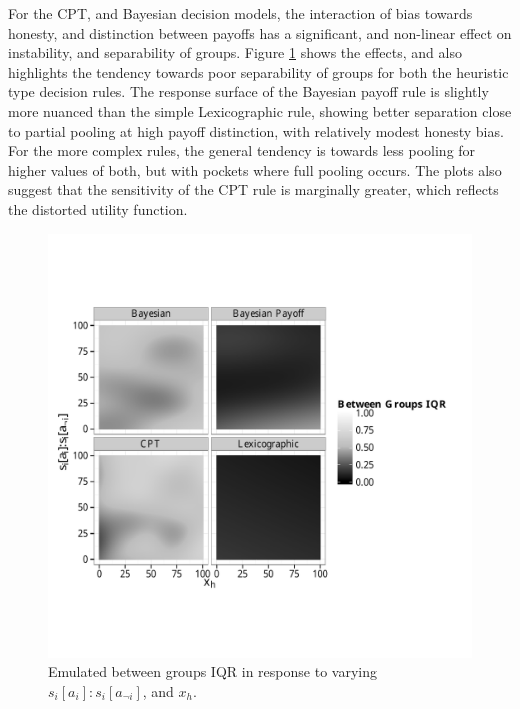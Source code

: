 For the \ac{CPT}, and Bayesian decision models, the interaction of bias towards honesty, and distinction between payoffs has a significant, and non-linear effect on instability, and separability of groups. Figure \ref{fig:emulated_payoff_group_iqr} shows the effects, and also highlights the tendency towards poor separability of groups for both the heuristic type decision rules. The response surface of the Bayesian payoff rule is slightly more nuanced than the simple Lexicographic rule, showing better separation close to partial pooling at high payoff distinction, with relatively modest honesty bias.  For the more complex rules, the general tendency is towards less pooling for higher values of both, but with pockets where full pooling occurs.  The plots also suggest that the sensitivity of the \ac{CPT} rule is marginally greater, which reflects the distorted utility function.

\begin{figure}[H]
\begin{adjustbox}{center}\includegraphics[width=0.8\linewidth]{figures/unfixed_emu_payoff_honesty_group_iqr}\end{adjustbox}
\caption{Emulated between groups IQR in response to varying \(s_{i}[a_{i}]:s_{i}[a_{\neg i}]\), and \(x_{h}\).}
\label{fig:emulated_payoff_group_iqr}
\end{figure}
